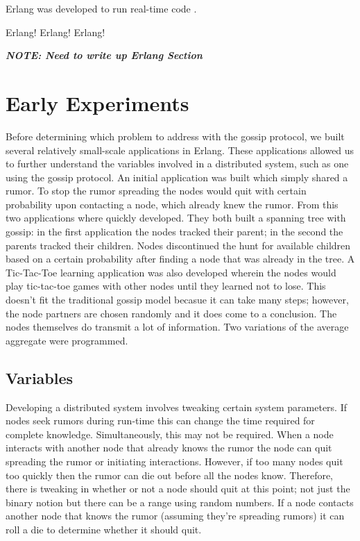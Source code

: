 \documentclass[11pt,twocolumn]{article}
\begin{document}
Erlang was developed to run real-time code \cite{Erlang}.

Erlang!  Erlang!  Erlang!

{\bf {\em NOTE: Need to write up Erlang Section}}

\section{Early Experiments}

Before determining which problem to address with the gossip protocol, we built several relatively small-scale applications in Erlang.  These applications allowed us to further understand the variables involved in a distributed system, such as one using the gossip protocol.  An initial application was built which simply shared a rumor.  To stop the rumor spreading the nodes would quit with certain probability upon contacting a node, which already knew the rumor.  From this two applications where quickly developed.  They both built a spanning tree with gossip: in the first application the nodes tracked their parent; in the second the parents tracked their children.  Nodes discontinued the hunt for available children based on a certain probability after finding a node that was already in the tree.  A Tic-Tac-Toe learning application was also developed wherein the nodes would play tic-tac-toe games with other nodes until they learned not to lose.  This doesn't fit the traditional gossip model becasue it can take many steps; however, the node partners are chosen randomly and it does come to a conclusion.  The nodes themselves do transmit a lot of information.  Two variations of the average aggregate were programmed.

\subsection{Variables}

Developing a distributed system involves tweaking certain system parameters.  If nodes seek rumors during run-time this can change the time required for complete knowledge.  Simultaneously, this may not be required.  When a node interacts with another node that already knows the rumor the node can quit spreading the rumor or initiating interactions.  However, if too many nodes quit too quickly then the rumor can die out before all the nodes know.  Therefore, there is tweaking in whether or not a node should quit at this point; not just the binary notion but there can be a range using random numbers.  If a node contacts another node that knows the rumor (assuming they're spreading rumors) it can roll a die to determine whether it should quit.  
\end{document}
